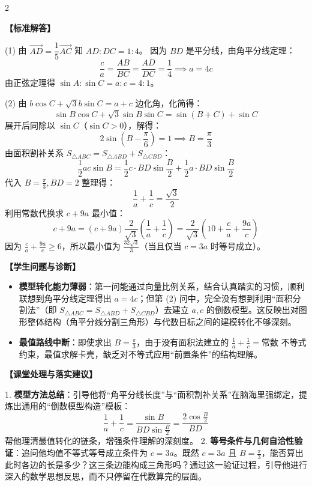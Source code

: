 \documentclass[11pt,a4paper]{ctexart}
\newcommand{\teachblock}[2]{%
  \par\addvspace{0.45em}%
  \noindent\textbf{【#1】}\par
  \begingroup
    \setlength{\parskip}{0.35em}%
    #2\par
  \endgroup
}
\newcommand{\teacherproblem}[2]{%
  \teachquestionheader{原卷第 #1 题\quad #2}
}
\begin{document}
\teacherproblem{月考 Q16}{角平分线与倒数最值}

{\small \qTriangleBisectorMinStem}
\begin{center}
  \qTriangleBisectorMinFigure[1.2]
\end{center}


\newpage

\begin{paracol}{2}
\teachblock{标准解答}{
  (1) 由 \(\vec{AD} = \dfrac{1}{5}\vec{AC}\) 知 \(AD : DC = 1 : 4\)。
  因为 \(BD\) 是平分线，由角平分线定理：
  \[
    \frac{c}{a} = \frac{AB}{BC} = \frac{AD}{DC} = \frac{1}{4} \implies a = 4c
  \]
  由正弦定理得 \(\sin A : \sin C = a : c = 4 : 1\)。\par
  (2) 由 $b\cos C + \sqrt{3}b\sin C = a + c$ 边化角，化简得：
  \[
    \sin B \cos C + \sqrt{3}\sin B \sin C = \sin(B+C) + \sin C
  \]
  展开后同除以 $\sin C$（$\sin C > 0$），解得：
  \[
    2\sin(B - \frac{\pi}{6}) = 1 \implies B = \frac{\pi}{3}
  \]
  由面积割补关系 \(S_{\triangle ABC} = S_{\triangle ABD} + S_{\triangle CBD}\)：
  \[
    \frac{1}{2}ac\sin B = \frac{1}{2}c \cdot BD \sin\frac{B}{2} + \frac{1}{2}a \cdot BD \sin\frac{B}{2}
  \]
  代入 $B = \frac{\pi}{3}, BD = 2$ 整理得：
  \[
    \frac{1}{a} + \frac{1}{c} = \frac{\sqrt{3}}{2}
  \]
  利用常数代换求 \(c+9a\) 最小值：
  \[
    c + 9a = (c + 9a)\frac{2}{\sqrt{3}}\left(\frac{1}{a} + \frac{1}{c}\right) = \frac{2}{\sqrt{3}}\left(10 + \frac{c}{a} + \frac{9a}{c}\right)
  \]
  因为 \(\frac{c}{a} + \frac{9a}{c} \ge 6\)，所以最小值为 \(\frac{32\sqrt{3}}{3}\)（当且仅当 $c = 3a$ 时等号成立）。
}

\switchcolumn
\teachblock{学生问题与诊断}{
  \begin{itemize}
    \item \textbf{模型转化能力薄弱}：第一问能通过向量比例关系，结合认真踏实的习惯，顺利联想到角平分线定理得出 $a=4c$；但第 (2) 问中，完全没有想到利用“面积分割法”（即 $S_{\triangle ABC} = S_{\triangle ABD} + S_{\triangle CBD}$）去建立 $a,c$ 的倒数模型。这反映出对图形整体结构（角平分线分割三角形）与代数目标之间的建模转化不够深刻。
    \item \textbf{最值路线中断}：即使求出 $B = \frac{\pi}{3}$，由于没有面积法建立的 \(\frac{1}{a} + \frac{1}{c} = \text{常数}\) 不等式约束，最值求解卡壳，缺乏对不等式应用“前置条件”的结构理解。
  \end{itemize}
}

\teachblock{课堂处理与落实建议}{
  1. \textbf{模型方法总结}：引导他将“角平分线长度”与“面积割补关系”在脑海里强绑定，提炼出通用的“倒数模型构造”模板：
  \[
    \frac{1}{a} + \frac{1}{c}
    =
    \frac{\sin B}{BD\sin\frac{B}{2}}
    =
    \frac{2\cos\frac{B}{2}}{BD}
  \]
  帮他理清最值转化的链条，增强条件理解的深刻度。
  2. \textbf{等号条件与几何自洽性验证}：追问他均值不等式等号成立条件为 $c=3a$。既然 $c=3a$ 且 $B=\frac{\pi}{3}$，能否算出此时各边的长是多少？这三条边能构成三角形吗？通过这一验证过程，引导他进行深入的数学思想反思，而不只停留在代数算完的层面。
}
\end{paracol}
\end{document}
